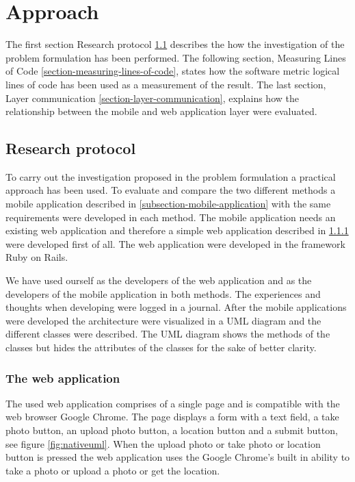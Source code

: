 \chapter{Approach}
The first section Research protocol \ref{section-research-protocol} describes the how the investigation of the problem formulation has been performed. The following section, Measuring Lines of Code \ref{section-measuring-lines-of-code}, states how the software metric logical lines of code has been used as a measurement of the result. The last section, Layer communication \ref{section-layer-communication}, explains how the relationship between the mobile and web application layer were evaluated. 


\section{Research protocol} \label{section-research-protocol}
To carry out the investigation proposed in the problem formulation a practical approach has been used. To evaluate and compare the two different methods a mobile application described in \ref{subsection-mobile-application} with the same requirements were developed in each method. The mobile application needs an existing web application and therefore a simple web application described in \ref{subsection-web-application} were developed first of all. The web application were developed in the framework Ruby on Rails. 

We have used ourself as the developers of the web application and as the developers of the mobile application in both methods. The experiences and thoughts when developing were logged in a journal. After the mobile applications were developed the architecture were visualized in a UML diagram and the different classes were described. The UML diagram shows the methods of the classes but hides the attributes of the classes for the sake of better clarity. 

\subsection{The web application} \label{subsection-web-application}
The used web application comprises of a single page and is compatible with the web browser Google Chrome. The page displays a form with a text field, a take photo button, an upload photo button, a location button and a submit button, see figure \ref{fig:nativeuml}. When the upload photo or take photo or location button is pressed the web application uses the Google Chrome’s built in ability to take a photo or upload a photo or get the location.

